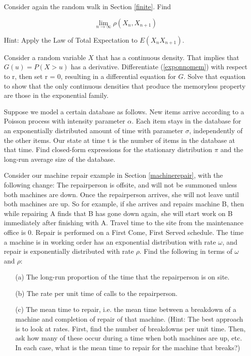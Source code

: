 \oneproblem
Consider again the random walk in Section \ref{finite}.  Find

\begin{equation}
\lim_{n \rightarrow \infty} \rho(X_n,X_{n+1})
\end{equation}

Hint:  Apply the Law of Total Expectation to $E(X_n X_{n+1})$.

\oneproblem
Consider a random variable $X$ that has a continuous density.  That 
implies that $G(u) = P(X > u)$ has a derivative.  Differentiate
(\ref{exponnomem}) with respect to r, then set r = 0, resulting in a
differential equation for $G$.  Solve that equation to show that the
only continuous densities that produce the memoryless property are those
in the exponential family.

\oneproblem
Suppose we model a certain database as follows. New items arrive
according to a Poisson process with intensity parameter $\alpha$. Each item
stays in the database for an exponentially distributed amount of time
with parameter $\sigma$, independently of the other items. Our state at time t
is the number of items in the database at that time. Find closed-form
expressions for the stationary distribution $\pi$ and the long-run average
size of the database.

\oneproblem Consider our machine repair example in Section
\ref{machinerepair}, with the following change: The repairperson is
offsite, and will not be summoned unless both machines are down. Once
the repairperson arrives, she will not leave until both machines are up.
So for example, if she arrives and repairs machine B, then while
repairing A finds that B has gone down again, she will start work on B
immediately after finishing with A. Travel time to the site from the
maintenance office is 0. Repair is performed on a First Come, First
Served schedule.  The time a machine is in working order has an
exponential distribution with rate $\omega$, and repair is exponentially
distributed with rate $\rho$. Find the following in terms of $\omega$
and $\rho$:

\begin{itemize}

\item [(a)] The long-run proportion of the time that the repairperson is
on site.

\item [(b)] The rate per unit time of calls to the repairperson.

\item [(c)] The mean time to repair, i.e. the mean time between a
breakdown of a machine and completion of repair of that machine. (Hint:
The best approach is to look at rates. First, find the number of
breakdowns per unit time. Then, ask how many of these occur during a
time when both machines are up, etc. In each case, what is the mean time
to repair for the machine that breaks?) 

\end{itemize}

